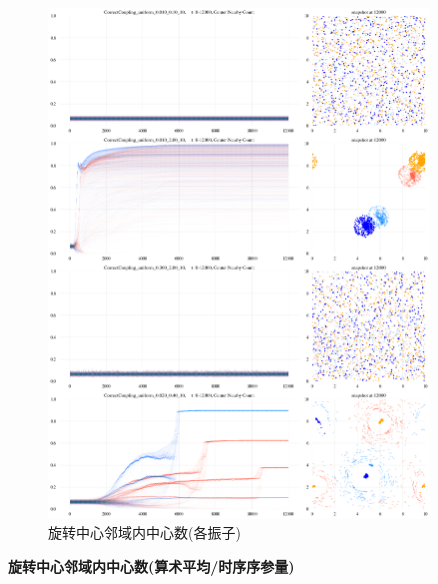 \documentclass{article}
\begin{document}
\begin{figure}[H]
	\centering
	\includegraphics[width=0.9\textwidth]{./figs/centerNearbyCounts.png}
	\caption{旋转中心邻域内中心数(各振子)}
	\label{fig:fig234t.4.1}
\end{figure}

\newpage
\noindent\textbf{旋转中心邻域内中心数(算术平均/时序序参量)}
\end{document}
